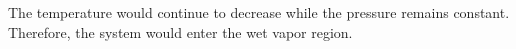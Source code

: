 The temperature would continue to decrease while the pressure remains constant. Therefore, the system would enter the wet vapor region.